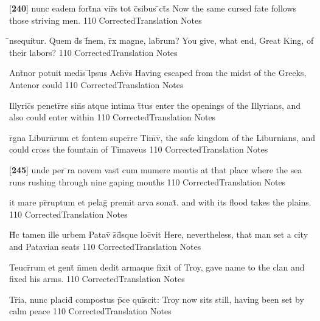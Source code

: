 \documentclass[]{book}
\begin{document}
\latline
  {[\textbf{240}] nunc eadem fort\={}na vir\={}s tot c\={}sibus \={}ct\={}s}
  { Now the same cursed fate follows those striving men. }
  {110}
  { CorrectedTranslation }
  { Notes }


\latline
  {\={\macron {\i}}nsequitur.  Quem d\={}s f\={\macron {\i}}nem, r\={}x magne, lab\={}rum?}
  { You give, what end, Great King, of their labors? }
  {110}
  { CorrectedTranslation }
  { Notes }


\latline
  {Ant\={}nor potuit medi\={\macron {\i}}s \={}l\={}psus Ach\={\macron {\i}}v\={\macron {\i}}s}
  { Having escaped from the midst of the Greeks, Antenor could }
  {110}
  { CorrectedTranslation }
  { Notes }


\latline
  {Illyric\={}s penetr\={}re sin\={}s atque intima t\={}tus}
  { enter the openings of the Illyrians, and also could enter within }
  {110}
  { CorrectedTranslation }
  { Notes }


\latline
  {r\={}gna Liburn\={}rum et fontem super\={}re Tim\={}v\={\macron {\i}},}
  { the safe kingdom of the Liburnians, and could cross the fountain of Timaveus }
  {110}
  { CorrectedTranslation }
  { Notes }


\latline
  {[\textbf{245}] unde per \={}ra novem vast\={} cum mumere montis}
  { at that place where the sea runs rushing through nine gaping mouths }
  {110}
  { CorrectedTranslation }
  { Notes }


\latline
  {it mare pr\={}ruptum et pelag\={} premit arva sonat\={\macron {\i}}.}
  { and with its flood takes the plains. }
  {110}
  { CorrectedTranslation }
  { Notes }


\latline
  {H\={\macron {\i}}c tamen ille urbem Patav\={\macron {\i}} s\={}d\={}sque loc\={}vit}
  { Here, nevertheless, that man set a city and Patavian seats }
  {110}
  { CorrectedTranslation }
  { Notes }


\latline
  {Teucr\={}rum et gent\={\macron {\i}} n\={}men dedit armaque fixit}
  { of Troy, gave name to the clan and fixed his arms. }
  {110}
  { CorrectedTranslation }
  { Notes }


\latline
  {Tr\={}ia, nunc placid\={} compostus p\={}ce qui\={}scit:}
  { Troy now sits still, having been set by calm peace  }
  {110}
  { CorrectedTranslation }
  { Notes }
\end{document}

